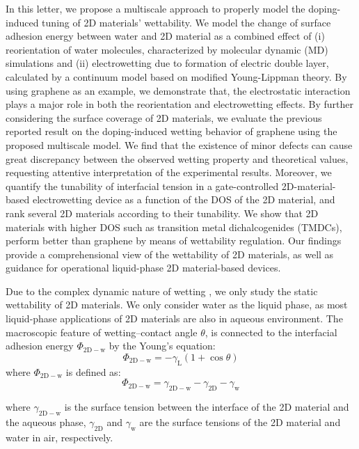 \documentclass[aps,prl,reprint,groupedaddress,amsmath,amssymb, showpacs]{revtex4-1}
\begin{document}
In this letter, we propose a multiscale approach to properly model the
doping-induced tuning of 2D materials' wettability. We model the
change of surface adhesion energy between water and 2D material as a
combined effect of (i) reorientation of water molecules, characterized
by molecular dynamic (MD) simulations and (ii) electrowetting due to
formation of electric double layer, calculated by a continuum model
based on modified Young-Lippman theory. By using graphene as an
example, we demonstrate that, the electrostatic interaction plays a
major role in both the reorientation and electrowetting effects. By
further considering the surface coverage of 2D materials, we evaluate
the previous reported result on the doping-induced wetting behavior of
graphene using the proposed multiscale model. We find that the
existence of minor defects can cause great discrepancy between the
observed wetting property and theoretical values, requesting attentive
interpretation of the experimental results. Moreover, we quantify the
tunability of interfacial tension in a gate-controlled
2D-material-based electrowetting device as a function of the DOS of
the 2D material, and rank several 2D materials according to their
tunability. We show that 2D materials with higher DOS such as
transition metal dichalcogenides (TMDCs), perform better than graphene
by means of wettability regulation. Our findings provide a
comprehensional view of the wettability of 2D materials, as well as
guidance for operational liquid-phase 2D material-based devices.



Due to the complex dynamic nature of wetting
\cite{Cassie_1944,Wenzel_1936,Gao_2007,Marmur_2009}, we only study the
static wettability of 2D materials. We only consider water as the
liquid phase, as most liquid-phase applications of 2D materials are
also in aqueous environment. The macroscopic feature of
wetting--contact angle \(\theta\), is connected to the interfacial
adhesion energy \(\Phi_{\mathrm{2D-w}}\) by the Young's equation:
\begin{equation}
\label{eqn:young's equation}
\Phi_{\mathrm{2D-w}} = -\gamma_{\mathrm{L}}(1+\cos\theta)
\end{equation}
where \(\Phi_{\mathrm{2D-w}}\) is defined as:
\begin{equation}
\label{eqn:def-adhesion}
\Phi_{\mathrm{2D-w}} = \gamma_{\mathrm{2D-w}} - \gamma_{\mathrm{2D}} - \gamma_{\mathrm{w}}
\end{equation}

where \(\gamma_{\mathrm{2D-w}}\) is the surface tension between the
interface of the 2D material and the aqueous phase,
\(\gamma_{\mathrm{2D}}\) and \(\gamma_{\mathrm{w}}\) are the surface
tensions of the 2D material and water in air,
respectively.
\end{document}
